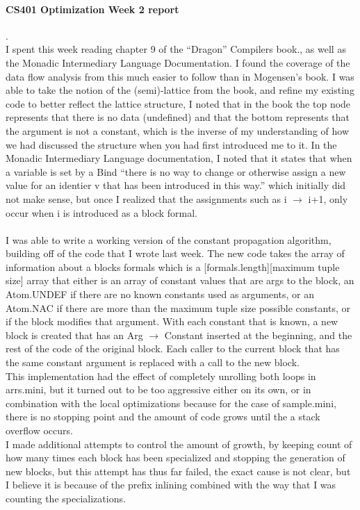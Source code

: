\documentclass[14pt]{article}
\author{Joel Anna<annajoel@pdx.edu>}
\begin{document}
\paragraph{CS401 Optimization Week 2 report} 
.\\
I spent this week reading chapter 9 of the ``Dragon'' Compilers book., as well as the Monadic Intermediary Language Documentation. I found the coverage of the data flow analysis from this much easier to follow than in Mogensen's book.
I was able to take the notion of the (semi)-lattice from the book, and refine my existing code to better reflect the lattice structure, I noted that in the book the top node represents that there is no data (undefined) and that the bottom represents that the argument is not a constant, which is the inverse of my understanding of how we had discussed the structure when you had first introduced me to it.
In the Monadic Intermediary Language documentation, I noted that it states that when a variable is set by a Bind ``there is no way to change or otherwise assign a new value for an identier v that has been introduced in this way.'' which initially did not make sense, but once I realized that the assignments such as i $\rightarrow$ i+1, only occur when i is introduced as a block formal.
\paragraph{} 
I was able to write a working version of the constant propagation algorithm, building off of the code that I wrote last week. The new code takes the array of information about a blocks formals which is a [formals.length][maximum tuple size] array that either is an array of constant values that are args to the block, an Atom.UNDEF if there are no known constants used as arguments, or an Atom.NAC if there are more than the maximum tuple size possible constants, or if the block modifies that argument. With each constant that is known, a new block is created that has an Arg $\rightarrow$ Constant inserted at the beginning, and the rest of the code of the original block. Each caller to the current block that has the same constant argument is replaced with a call to the new block.\\
This implementation had the effect of completely unrolling both loops in arrs.mini, but it turned out to be too aggressive either on its own, or in combination with the local optimizations because for the case of sample.mini, there is no stopping point and the amount of code grows until the a stack overflow occurs.\\
I made additional attempts to control the amount of growth, by keeping count of how many times each block has been specialized and stopping the generation of new blocks, but this attempt has thus far failed, the exact cause is not clear, but I believe it is because of the prefix inlining combined with the way that I was counting the specializations.\\
\end{document}
